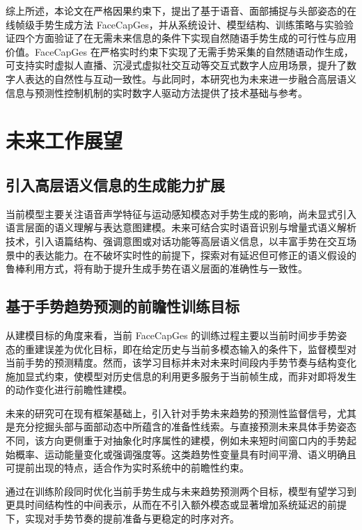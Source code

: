 综上所述，本论文在严格因果约束下，提出了基于语音、面部捕捉与头部姿态的在线帧级手势生成方法 FaceCapGes，并从系统设计、模型结构、训练策略与实验验证四个方面验证了在无需未来信息的条件下实现自然随语手势生成的可行性与应用价值。FaceCapGes 在严格实时约束下实现了无需手势采集的自然随语动作生成，可支持实时虚拟人直播、沉浸式虚拟社交互动等交互式数字人应用场景，提升了数字人表达的自然性与互动一致性。与此同时，本研究也为未来进一步融合高层语义信息与预测性控制机制的实时数字人驱动方法提供了技术基础与参考。

\section{未来工作展望}

\subsection{引入高层语义信息的生成能力扩展}

当前模型主要关注语音声学特征与运动感知模态对手势生成的影响，尚未显式引入语言层面的语义理解与表达意图建模。未来可结合实时语音识别与增量式语义解析技术，引入语篇结构、强调意图或对话功能等高层语义信息，以丰富手势在交互场景中的表达能力。在不破坏实时性的前提下，探索对有延迟但可修正的语义假设的鲁棒利用方式，将有助于提升生成手势在语义层面的准确性与一致性。

\subsection{基于手势趋势预测的前瞻性训练目标}

从建模目标的角度来看，当前 FaceCapGes 的训练过程主要以当前时间步手势姿态的重建误差为优化目标，即在给定历史与当前多模态输入的条件下，监督模型对当前手势的预测精度。然而，该学习目标并未对未来时间段内手势节奏与结构变化施加显式约束，使模型对历史信息的利用更多服务于当前帧生成，而非对即将发生的动作变化进行前瞻性建模。

未来的研究可在现有框架基础上，引入针对手势未来趋势的预测性监督信号，尤其是充分挖掘头部与面部动态中所蕴含的准备性线索。与直接预测未来具体手势姿态不同，该方向更侧重于对抽象化时序属性的建模，例如未来短时间窗口内的手势起始概率、运动能量变化或强调强度等。这类趋势性变量具有时间平滑、语义明确且可提前出现的特点，适合作为实时系统中的前瞻性约束。

通过在训练阶段同时优化当前手势生成与未来趋势预测两个目标，模型有望学习到更具时间结构性的中间表示，从而在不引入额外模态或显著增加系统延迟的前提下，实现对手势节奏的提前准备与更稳定的时序对齐。